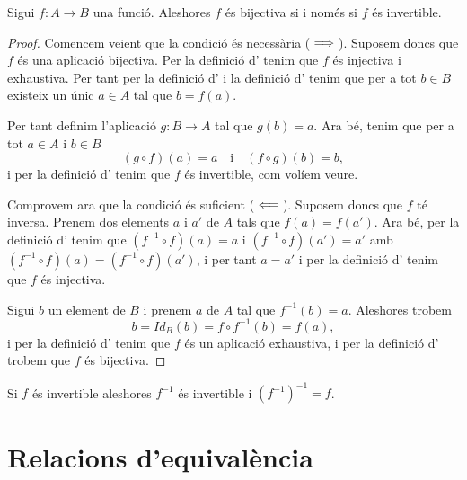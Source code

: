 \documentclass[../../Main.tex]{subfiles}
\begin{document}
	\begin{theorem}
		\label{thm:bijectiva iff invertible}
		Sigui \(f\colon A\rightarrow B\) una funció. Aleshores \(f\) és bijectiva si i només si \(f\) és invertible.
		\begin{proof}
			Comencem veient que la condició és necessària (\(\implies\)). Suposem doncs que \(f\) és una aplicació bijectiva. Per la definició d' tenim que \(f\) és injectiva i exhaustiva. Per tant per la definició d' i la definició d' tenim que per a tot \(b\in B\) existeix un únic \(a\in A\) tal que \(b=f(a)\).
			
			Per tant definim l'aplicació \(g\colon B\rightarrow A\) tal que \(g(b)=a\). Ara bé, tenim que per a tot \(a\in A\) i \(b\in B\)
			\[(g\circ f)(a)=a\quad\text{i}\quad(f\circ g)(b)=b,\]
			i per la definició d' tenim que \(f\) és invertible, com volíem veure.
			
			Comprovem ara que la condició és suficient (\(\impliedby\)). Suposem doncs que \(f\) té inversa. Prenem dos elements \(a\) i \(a'\) de \(A\) tals que \(f(a)=f(a')\). Ara bé, per la definició d' tenim que \((f^{-1}\circ f)(a)=a\) i \((f^{-1}\circ f)(a')=a'\) amb \((f^{-1}\circ f)(a)=(f^{-1}\circ f)(a')\), i per tant \(a=a'\) i per la definició d' tenim que \(f\) és injectiva.
			
			Sigui \(b\) un element de \(B\) i prenem \(a\) de \(A\) tal que \(f^{-1}(b)=a\). Aleshores trobem
			\[b=Id_{B}(b)=f\circ f^{-1}(b)=f(a),\]
			i per la definició d' tenim que \(f\) és un aplicació exhaustiva, i per la definició d' trobem que \(f\) és bijectiva.
		\end{proof}
	\end{theorem}
	\begin{corollary}
		\label{cor:la inversa d'una aplicació invertible és invertible}
		Si \(f\) és invertible aleshores \(f^{-1}\) és invertible i \(\left(f^{-1}\right)^{-1}=f\).
	\end{corollary}
\section{Relacions d'equivalència}
\end{document}
